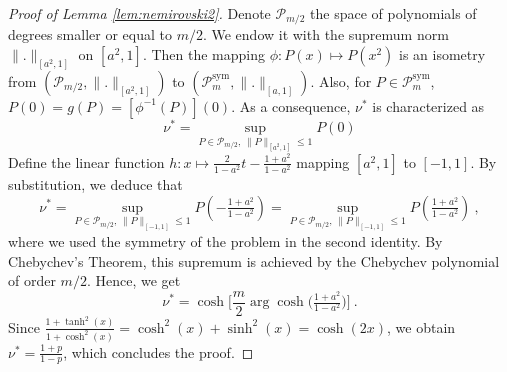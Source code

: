 \documentclass[twoside,11pt]{article}
\def\cP{\mathcal{P}}
\newcommand{\<}{\langle}
\renewcommand{\>}{\rangle}
\begin{document}
\begin{proof}[Proof of Lemma \ref{lem:nemirovski2}]
 Denote $\cP_{m/2}$ the space of polynomials of degrees smaller or equal to $m/2$. We endow it with the supremum norm $\|.\|_{[a^2,1]}$ on $[a^2,1]$. Then the mapping $\phi: P(x) \mapsto  P(x^2)$ is an isometry from $(\cP_{m/2},\|.\|_{[a^2,1]})$ to $(\cP_{m}^{\text{sym}},\|.\|_{[a,1]})$. Also, for $P\in \cP_{m}^{\text{sym}}$, $P(0)=g(P)= [\phi^{-1}(P)](0)$. As a consequence, $\nu^*$ is characterized as 
\[
 \nu^*= \sup_{P\in \cP_{m/2}, \, \|P\|_{[a^2,1]}\leq 1 }P(0)
 \]
 Define the linear function $h: x\mapsto \frac{2}{1-a^2}t-  \frac{1+a^2}{1-a^2}$ mapping $[a^2,1]$ to $[-1,1]$. By substitution, we deduce that 
 \[
  \nu^*= \sup_{P\in \cP_{m/2}, \, \|P\|_{[-1,1]}\leq 1 }P\left(-  \tfrac{1+a^2}{1-a^2}\right)= \sup_{P\in \cP_{m/2}, \, \|P\|_{[-1,1]}\leq 1 }P\left(  \tfrac{1+a^2}{1-a^2}\right)\ ,
 \]
where we used the symmetry of the problem in the second identity. By Chebychev's Theorem, this supremum is achieved by the Chebychev polynomial of order $m/2$. Hence, we get
\[
 \nu^*= \cosh\Big[\frac{m}{2}\arg\cosh\big(\tfrac{1+a^2}{1-a^2}\big)\Big]\ . 
\]
Since $\frac{1+\tanh^2(x)}{1+\cosh^2(x)}= \cosh^2(x)+\sinh^2(x)= \cosh(2x)$, we obtain $\nu^*= \tfrac{1+p}{1-p}$, which concludes the proof.


 
\end{proof}
\end{document}
